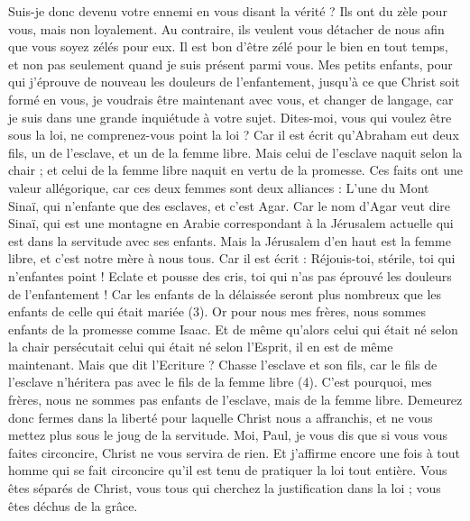 \begin{multicols}{2}
Suis-je donc devenu votre ennemi en vous disant la vérité ?
Ils ont du zèle pour vous, mais non loyalement. Au contraire, ils veulent vous détacher de nous afin que vous soyez zélés pour eux.
Il est bon d'être zélé pour le bien en tout temps, et non pas seulement quand je suis présent parmi vous.
Mes petits enfants, pour qui j’éprouve de nouveau les douleurs de l’enfantement, jusqu'à ce que Christ soit formé en vous,
je voudrais être maintenant avec vous, et changer de langage, car je suis dans une grande inquiétude à votre sujet.
Dites-moi, vous qui voulez être sous la loi, ne comprenez-vous point la loi ?
Car il est écrit qu'Abraham eut deux fils, un de l’esclave, et un de la femme libre.
Mais celui de l’esclave naquit selon la chair ; et celui de la femme libre naquit en vertu de la promesse.
Ces faits ont une valeur allégorique, car ces deux femmes sont deux alliances : L'une du Mont Sinaï, qui n’enfante que des esclaves, et c'est Agar.
Car le nom d'Agar veut dire Sinaï, qui est une montagne en Arabie correspondant à la Jérusalem actuelle qui est dans la servitude avec ses enfants.
Mais la Jérusalem d'en haut est la femme libre, et c'est notre mère à nous tous.
Car il est écrit : Réjouis-toi, stérile, toi qui n’enfantes point ! Eclate et pousse des cris, toi qui n’as pas éprouvé les douleurs de l’enfantement ! Car les enfants de la délaissée seront plus nombreux que les enfants de celle qui était mariée (3).
Or pour nous mes frères, nous sommes enfants de la promesse comme Isaac.
Et de même qu’alors celui qui était né selon la chair persécutait celui qui était né selon l'Esprit, il en est de même maintenant.
Mais que dit l'Ecriture ? Chasse l’esclave et son fils, car le fils de l’esclave n’héritera pas avec le fils de la femme libre (4).
C’est pourquoi, mes frères, nous ne sommes pas enfants de l’esclave, mais de la femme libre.
\VerseOne{}Demeurez donc fermes dans la liberté pour laquelle Christ nous a affranchis, et ne vous mettez plus sous le joug de la servitude.
Moi, Paul, je vous dis que si vous vous faites circoncire, Christ ne vous servira de rien.
Et j’affirme encore une fois à tout homme qui se fait circoncire qu’il est tenu de pratiquer la loi tout entière.
Vous êtes séparés de Christ, vous tous qui cherchez la justification dans la loi ; vous êtes déchus de la grâce.

\end{multicols}
